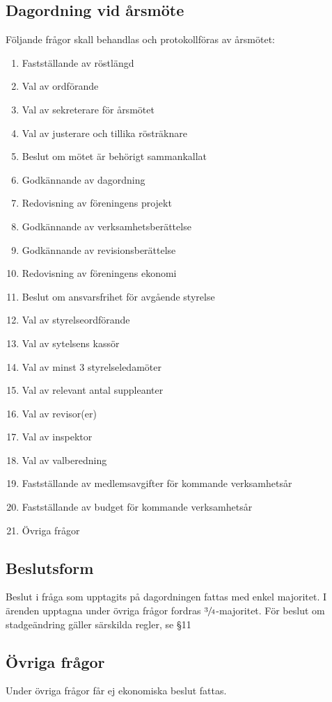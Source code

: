 \documentclass[11pt,a4paper]{article}
\begin{document}
\subsection{Dagordning vid årsmöte}
Följande frågor skall behandlas och protokollföras av årsmötet:
\begin{enumerate}
\item Fastställande av röstlängd
\item Val av ordförande
\item Val av sekreterare för årsmötet
\item Val av justerare och tillika rösträknare
\item Beslut om mötet är behörigt sammankallat
\item Godkännande av dagordning
\item Redovisning av föreningens projekt
\item Godkännande av verksamhetsberättelse
\item Godkännande av revisionsberättelse
\item Redovisning av föreningens ekonomi
\item Beslut om ansvarsfrihet för avgående styrelse
\item Val av styrelseordförande
\item Val av sytelsens kassör
\item Val av minst 3 styrelseledamöter
\item Val av relevant antal suppleanter
\item Val av revisor(er)
\item Val av inspektor
\item Val av valberedning
\item Fastställande av medlemsavgifter för kommande verksamhetsår
\item Fastställande av budget för kommande verksamhetsår
\item Övriga frågor
\end{enumerate}
\subsection{Beslutsform}
Beslut i fråga som upptagits på dagordningen fattas med enkel majoritet. I
ärenden upptagna under övriga frågor fordras \(\sfrac{3}{4}\)-majoritet. För beslut om stadgeändring gäller särskilda regler, se \S11
\subsection{Övriga frågor}
Under övriga frågor får ej ekonomiska beslut fattas.
\end{document}
